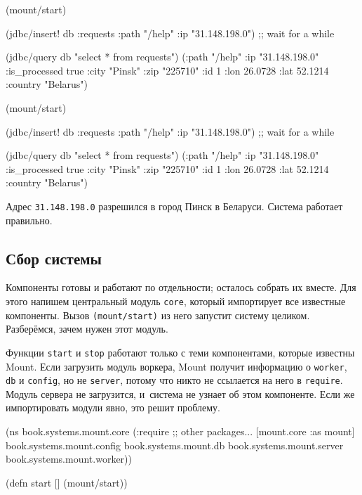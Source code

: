 \begin{english}
  \begin{clojure}
(mount/start)

(jdbc/insert! db :requests
  {:path "/help" :ip "31.148.198.0"})
;; wait for a while

(jdbc/query db "select * from requests")
({:path "/help"
  :ip "31.148.198.0"
  :is_processed true
  :city "Pinsk"
  :zip "225710" :id 1
  :lon 26.0728 :lat 52.1214
  :country "Belarus"})
  \end{clojure}
\end{english}

\else

\begin{english}
  \begin{clojure}
(mount/start)

(jdbc/insert! db :requests
              {:path "/help" :ip "31.148.198.0"})
;; wait for a while

(jdbc/query db "select * from requests")
({:path "/help" :ip "31.148.198.0" :is_processed true
  :city "Pinsk" :zip "225710" :id 1
  :lon 26.0728 :lat 52.1214 :country "Belarus"})
  \end{clojure}
\end{english}

\fi

Адрес \verb|31.148.198.0| разрешился в город Пинск в Беларуси. Система работает
правильно.

\subsection{Сбор системы}


Компоненты готовы и работают по отдельности; осталось собрать их вместе. Для
этого напишем центральный модуль \verb|core|, который импортирует все известные
компоненты. Вызов \verb|(mount/start)| из него запустит систему
целиком. Разберёмся, зачем нужен этот модуль.

Функции \verb|start| и \verb|stop| работают только с теми компонентами, которые
известны Mount. Если загрузить модуль воркера, Mount получит информацию о
\verb|worker|, \verb|db| и \verb|config|, но не \verb|server|, потому что никто
не ссылается на него в \verb|require|. Модуль сервера не загрузится, и~система
не узнает об этом компоненте. Если же импортировать модули явно, это решит
проблему.

\label{mount-main}

\begin{english}
  \begin{clojure}
(ns book.systems.mount.core
  (:require
   ;; other packages...
   [mount.core :as mount]
   book.systems.mount.config
   book.systems.mount.db
   book.systems.mount.server
   book.systems.mount.worker))

(defn start []
  (mount/start))
  \end{clojure}
\end{english}

